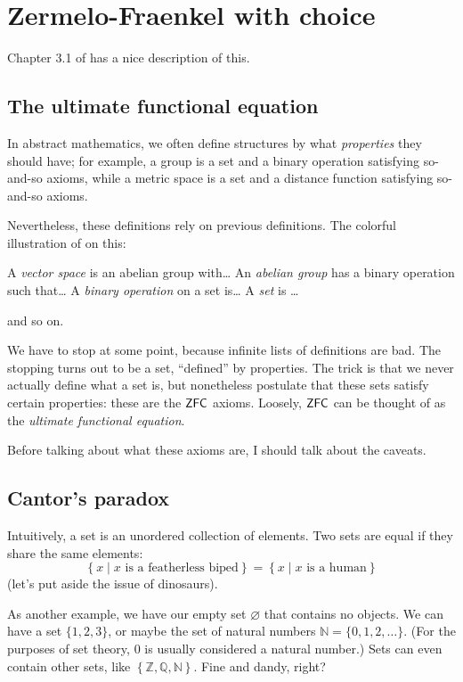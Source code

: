 \chapter{Zermelo-Fraenkel with choice}
\label{ch:zfc}
Chapter 3.1 of \cite{ref:msci} has a nice description of this.

\section{The ultimate functional equation}
In abstract mathematics, we often define structures by what \emph{properties}
they should have; for example, a group is a set and a binary operation
satisfying so-and-so axioms, while a metric space is a set and a distance function
satisfying so-and-so axioms.

Nevertheless, these definitions rely on previous definitions.
The colorful illustration of \cite{ref:msci} on this:
\begin{itemize}
	\ii A \emph{vector space} is an abelian group with\dots
	\ii An \emph{abelian group} has a binary operation such that\dots
	\ii A \emph{binary operation} on a set is\dots
	\ii A \emph{set} is \dots
\end{itemize}
and so on.

We have to stop at some point, because infinite lists of definitions are bad.
The stopping turns out to be a set, ``defined'' by properties.
The trick is that we never actually define what a set is,
but nonetheless postulate that these sets satisfy certain properties:
these are the $\mathsf{ZFC}$ axioms.
Loosely, $\mathsf{ZFC}$ can be thought of as the \emph{ultimate functional equation}.

Before talking about what these axioms are, I should talk about the caveats.

\section{Cantor's paradox}
Intuitively, a set is an unordered collection of elements.
Two sets are equal if they share the same elements:
\[
	\left\{ x \mid x \text{ is a featherless biped} \right\}
	=
	\left\{ x \mid x \text{ is a human} \right\}
\]
(let's put aside the issue of dinosaurs).

As another example, we have our empty set $\varnothing$ that contains no objects.
We can have a set $\{1, 2, 3\}$, or maybe the set of natural numbers $\mathbb N = \{0, 1, 2, \dots \}$.
(For the purposes of set theory, $0$ is usually considered a natural number.)
Sets can even contain other sets, like $\left\{ \mathbb Z, \mathbb Q, \mathbb N \right\}$. Fine and dandy, right?

